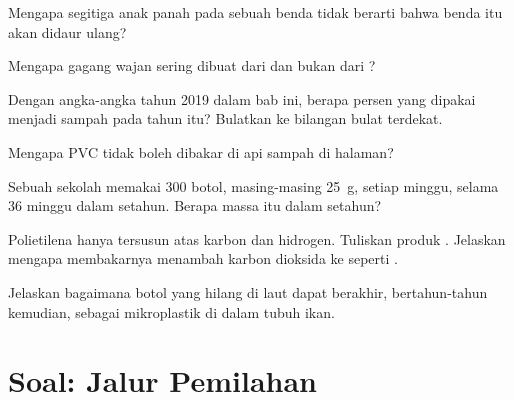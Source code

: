 \begin{exercise}[$\star\star$]\label{exo:g8:plastics:6}
Mengapa segitiga anak panah pada sebuah benda tidak berarti bahwa benda
itu akan didaur ulang?
\end{exercise}

\begin{exercise}[$\star\star$]\label{exo:g8:plastics:7}
Mengapa gagang wajan sering dibuat dari  dan bukan dari
?
\end{exercise}

\begin{exercise}[$\star\star$]\label{exo:g8:plastics:8}
Dengan angka-angka tahun 2019 dalam bab ini, berapa persen  yang
dipakai menjadi sampah pada tahun itu? Bulatkan ke bilangan bulat
terdekat.
\end{exercise}

\begin{exercise}[$\star\star$]\label{exo:g8:plastics:9}
Mengapa PVC tidak boleh dibakar di api  sampah di halaman?
\end{exercise}

\begin{exercise}[$\star\star$]\label{exo:g8:plastics:10}
Sebuah sekolah memakai 300 botol, masing-masing \qty{25}{g}, setiap
minggu, selama 36 minggu dalam setahun. Berapa massa  itu dalam
setahun?
\end{exercise}

\begin{exercise}[$\star\star\star$]\label{exo:g8:plastics:11}
Polietilena hanya tersusun atas karbon dan hidrogen. Tuliskan produk
. Jelaskan mengapa membakarnya menambah karbon
dioksida ke  seperti .
\end{exercise}

\begin{exercise}[$\star\star\star$]\label{exo:g8:plastics:12}
Jelaskan bagaimana botol  yang hilang di laut dapat berakhir,
bertahun-tahun kemudian, sebagai mikroplastik di dalam tubuh ikan.
\end{exercise}

\section{Soal: Jalur Pemilahan}

